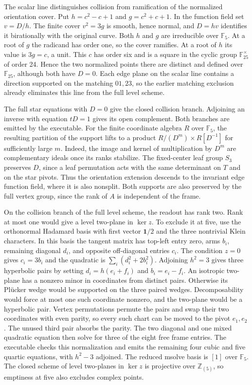 The scalar line distinguishes collision from ramification of
the normalized orientation cover. Put \(h=c^2-c+1\) and
\(g=c^2+c+1\). In the function field set \(v=D/h\).
The finite cover \(v^2=3g\) is smooth, hence normal, and
\(D=hv\) identifies it birationally with the original curve.
Both \(h\) and \(g\) are irreducible over \(\mathbb F_5\).
At a root of \(g\) the radicand has order one, so the cover
ramifies. At a root of \(h\) its value is \(3g=c\), a unit.
This \(c\) has order six and is a square in the cyclic group
\(\mathbb F_{25}^{\times}\) of order 24. Hence the two normalized
points there are distinct and defined over \(\mathbb F_{25}\),
although both have \(D=0\). Each edge plane on the scalar line
contains a direction supported on the matching \(01,23\), so the
earlier matching exclusion already eliminates this line from the
full level scheme.

The full star equations with \(D=0\) give the closed collision
branch. Adjoining an inverse with equation \(tD=1\) gives its open
complement. Both branches are emitted by the executable. For the
finite coordinate algebra \(R\) over \(\mathbb F_5\), the resulting
partition of the support lifts to a product
\(R/(D^m)\times R[D^{-1}]\) for sufficiently large \(m\).
Indeed, the image and kernel of multiplication by \(D^m\) are
complementary ideals once its ranks stabilize.
The fixed-center leaf group \(S_3\) preserves \(D\), since a leaf
permutation acts with the same determinant on \(T\) and on the star
pivots. Thus the orientation extension descends to the invariant
edge function field, where it is also nonsplit.
Both supports are also preserved by the full vertex group,
since the rank of \(A\) is independent of the frame.

On the collision branch of the full level scheme, the readout has
rank two. Rank at most one would give a level two-plane in
\(\ker z\). To exclude it at five, use the orthonormal Hadamard
basis with first vector \(\mathbf1/2\) and the three nontrivial
Klein characters. In this basis the tangent matrix has top-left
entry zero, arms \(b_i\), remaining diagonal \(d_i\), and opposite
off-diagonal entries \(c_i\). The condition \(z=0\) gives
\(c_i=3b_i\) and the quadratic is \(\sum_i(d_i^2+2b_i^2)\).
Adjoining \(h^2=3\) gives three hyperbolic pairs by setting
\(d_i=h(e_i+f_i)\) and \(b_i=e_i-f_i\). An isotropic two-plane
has a nonzero minor in coordinates from distinct pairs.
Otherwise its Pl\"ucker wedge would be supported on the three
paired wedges. Decomposability would force at most one such
coordinate nonzero, and the two-plane would be a hyperbolic pair.
Vertex permutations permute the pairs and swap their two
coordinates with even parity, so every such chart can be moved
to the pivot \(e_1,e_2\). The unused third pair absorbs the parity.
The two diagonal and one mixed quadratic equation then solve for
three of the eight free frame entries. The executable checks this
normalization and emits the remaining four cubic and five quartic
equations, with \(h^2-3\) adjoined. The reduced msolve basis is
\([1]\) over \(\mathbb F_5\). The closed scheme of level two-planes
in \(\ker z\) is projective over \(\mathbb Z_{(5)}\), so emptiness
at five also excludes complex points.

